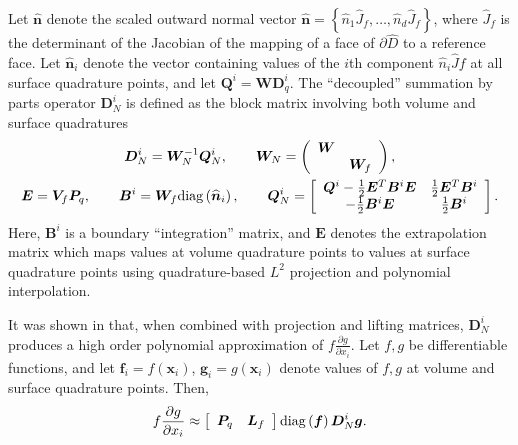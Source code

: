 \documentclass{svjour3}                     %
\renewcommand{\hat}{\widehat}
\newcommand{\diag}[1]{{\rm diag}\LRp{#1}}
\newcommand{\pd}[2]{\frac{\partial#1}{\partial#2}}
\newcommand{\LRp}[1]{\left( #1 \right)}
\newcommand{\LRs}[1]{\left[ #1 \right]}
\newcommand{\LRc}[1]{\left\{ #1 \right\}}
\begin{document}
Let $\hat{\bm{n}}$ denote the scaled outward normal vector $\hat{\bm{n}} = \LRc{\hat{n}_1\hat{J}_f,\ldots,\hat{n}_d\hat{J}_f}$, where $\hat{J}_f$ is the determinant of the Jacobian of the mapping of a face of $\partial \hat{D}$ to a reference face.  Let $\hat{\bm{n}}_i$ denote the vector containing values of the $i$th component $\hat{n}_i\hat{J}f$ at all surface quadrature points, and let $\bm{Q}^i = \bm{W}\bm{D}^i_q$.  The ``decoupled'' summation by parts operator $\bm{D}^i_N$ is defined as the block matrix involving both volume and surface quadratures
\begin{gather}
\bm{D}^i_N = \bm{W}_N^{-1} \bm{Q}^i_N, \qquad \bm{W}_N = \LRp{\begin{array}{cc}\bm{W}&\\ & \bm{W}_f\end{array}}, \label{eq:QN}\\
\bm{E} = \bm{V}_f\bm{P}_q, \qquad \bm{B}^i = \bm{W}_f \diag{\hat{\bm{n}}_i}, \qquad \bm{Q}^i_N  = \LRs{
\begin{array}{cc}
\bm{Q}^i - \frac{1}{2}\bm{E}^T\bm{B}^i\bm{E} &  \frac{1}{2}\bm{E}^T\bm{B}^i\\
-\frac{1}{2}\bm{B}^i\bm{E} & \frac{1}{2} \bm{B}^i
\end{array}}.  \nonumber
\end{gather}
Here, $\bm{B}^i$ is a boundary ``integration'' matrix, and $\bm{E}$ denotes the extrapolation matrix which maps values at volume quadrature points to values at surface quadrature points using quadrature-based $L^2$ projection and polynomial interpolation.  

It was shown in \cite{chan2017discretely, chan2018efficient} that, when combined with projection and lifting matrices, $\bm{D}^i_N$ produces a high order polynomial approximation of $f\pd{g}{x_i}$. 
Let $f, g$ be differentiable functions, and let $\bm{f}_i = f(\bm{x}_i)$, $\bm{g}_i = g(\bm{x}_i)$ denote values of $f,g$ at volume and surface quadrature points.  Then,
\begin{gather}
f\pd{g}{x_i} \approx \LRs{\begin{array}{cc}
\bm{P}_q & \bm{L}_f\end{array}} {\rm diag}\LRp{\bm{f}}\bm{D}^i_N \bm{g}.  
\label{eq:dnapprox}
\end{gather}
\end{document}
